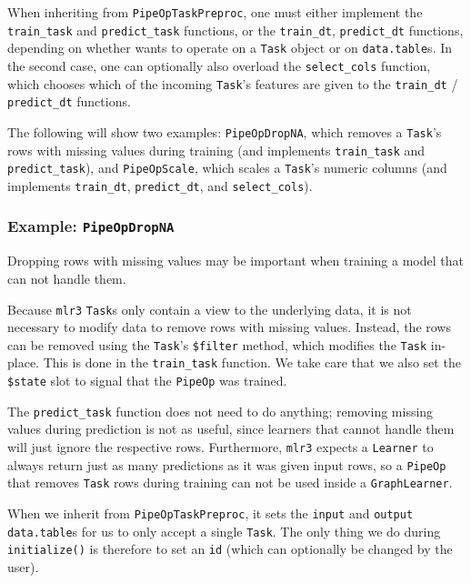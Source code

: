 \documentclass[]{scrbook}
\begin{document}
When inheriting from \texttt{PipeOpTaskPreproc}, one must either implement the \texttt{train\_task} and \texttt{predict\_task} functions, or the \texttt{train\_dt}, \texttt{predict\_dt} functions, depending on whether wants to operate on a \texttt{Task} object or on \texttt{data.table}s.
In the second case, one can optionally also overload the \texttt{select\_cols} function, which chooses which of the incoming \texttt{Task}'s features are given to the \texttt{train\_dt} / \texttt{predict\_dt} functions.

The following will show two examples: \texttt{PipeOpDropNA}, which removes a \texttt{Task}'s rows with missing values during training (and implements \texttt{train\_task} and \texttt{predict\_task}), and \texttt{PipeOpScale}, which scales a \texttt{Task}'s numeric columns (and implements \texttt{train\_dt}, \texttt{predict\_dt}, and \texttt{select\_cols}).

\hypertarget{example-pipeopdropna}{%
\subsubsection{\texorpdfstring{Example: \texttt{PipeOpDropNA}}{Example: PipeOpDropNA}}\label{example-pipeopdropna}}

Dropping rows with missing values may be important when training a model that can not handle them.

Because \texttt{mlr3} \texttt{Task}s only contain a view to the underlying data, it is not necessary to modify data to remove rows with missing values.
Instead, the rows can be removed using the \texttt{Task}'s \texttt{\$filter} method, which modifies the \texttt{Task} in-place.
This is done in the \texttt{train\_task} function. We take care that we also set the \texttt{\$state} slot to signal that the \texttt{PipeOp} was trained.

The \texttt{predict\_task} function does not need to do anything; removing missing values during prediction is not as useful, since learners that cannot handle them will just ignore the respective rows.
Furthermore, \texttt{mlr3} expects a \texttt{Learner} to always return just as many predictions as it was given input rows, so a \texttt{PipeOp} that removes \texttt{Task} rows during training can not be used inside a \texttt{GraphLearner}.

When we inherit from \texttt{PipeOpTaskPreproc}, it sets the \texttt{input} and \texttt{output} \texttt{data.table}s for us to only accept a single \texttt{Task}.
The only thing we do during \texttt{initialize()} is therefore to set an \texttt{id} (which can optionally be changed by the user).
\end{document}
